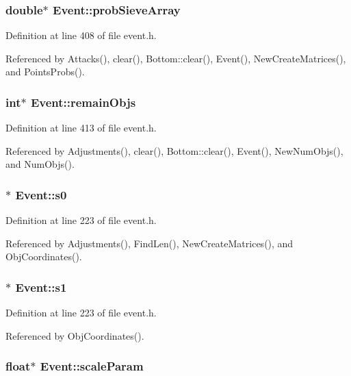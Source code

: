 \subsubsection{\setlength{\rightskip}{0pt plus 5cm}double$\ast$ {\bf Event::prob\-Sieve\-Array}}\label{classEvent_o30}




Definition at line 408 of file event.h.

Referenced by Attacks(), clear(), Bottom::clear(), Event(), New\-Create\-Matrices(), and Points\-Probs().
\subsubsection{\setlength{\rightskip}{0pt plus 5cm}int$\ast$ {\bf Event::remain\-Objs}}\label{classEvent_o34}




Definition at line 413 of file event.h.

Referenced by Adjustments(), clear(), Bottom::clear(), Event(), New\-Num\-Objs(), and Num\-Objs().
\subsubsection{$\ast$ {\bf Event::s0}}\label{classEvent_o1}




Definition at line 223 of file event.h.

Referenced by Adjustments(), Find\-Len(), New\-Create\-Matrices(), and Obj\-Coordinates().
\subsubsection{ $\ast$ {\bf Event::s1}}\label{classEvent_o3}




Definition at line 223 of file event.h.

Referenced by Obj\-Coordinates().
\subsubsection{\setlength{\rightskip}{0pt plus 5cm}float$\ast$ {\bf Event::scale\-Param}}\label{classEvent_o57}




